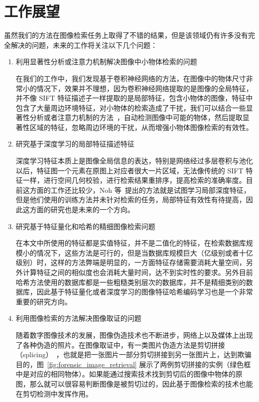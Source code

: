 \section{工作展望}
虽然我们的方法在图像检索任务上取得了不错的结果，但是该领域仍有许多没有完全解决的问题，未来的工作将关注以下几个问题：

\begin{enumerate}
\item 利用显著性分析或注意力机制解决图像中小物体检索的问题

在我们的工作中，我们发现基于卷积神经网络的方法，在图像中的物体尺寸非常小的情况下，效果并不理想，因为卷积神经网络提取的是图像的全局特征，并不像 SIFT 特征描述子一样提取的是局部特征，包含小物体的图像，特征中包含了大量周边环境特征，对小物体的检索造成了干扰，我们可以结合一些显著性分析或者注意力机制的方法~\cite{Song2017DeepSA}，自动检测图像中可能的物体，然后提取显著性区域的特征，忽略周边环境的干扰，从而增强小物体图像检索的有效性。

\item 研究基于深度学习的局部特征描述特征

深度学习特征本质上是图像全局信息的表达，特别是网络经过多层卷积与池化以后，特征图一个元素在原图上对应者很大一片区域，无法像传统的 SIFT 特征一样，进行空间几何校验，进行检索结果重排序，提高检索的准确率度。目前这方面的工作还比较少，Noh 等~\cite{Noh2017LargeScaleIR}提出的方法就是试图学习局部深度特征，但是他们使用的训练方法并未针对检索的任务，局部特征有效性有待提高，因此这方面的研究也是未来的一个方向。

\item 研究基于特征量化和哈希的精细图像检索问题

在本文中所使用的特征都是实值特征，并不是二值化的特征，在检索数据库规模小的情况下，这些方法是可行的，但是当数据库规模巨大（亿级别或者十亿级别）时，这样的方法弊端是明显的，一方面特征存储需要消耗大量空间，另外计算特征之间的相似度也会消耗大量时间，达不到实时性的要求。另外目前哈希方法使用的数据库都是一些粗糙类别层次的数据库，并不是精细类别的数据库，因此基于特征量化或者深度学习的图像特征哈希编码学习也是一个非常重要的研究方向。

\item 利用图像检索的方法解决图像取证的问题

随着数字图像技术的发展，图像伪造技术也不断进步，网络上以及媒体上出现了各种伪造的照片。在图像取证中，有一类图片伪造方法是剪切拼接（splicing）~\cite{Farid2009ImageFD}，也就是把一张图片一部分剪切拼接到另一张图片上，达到欺骗目的，图~\ref{fig:forensic_image_retrieval} 展示了两例剪切拼接的实例（绿色框中是对应的相同物体）。如果能通过搜索技术找到剪切后的图像中物体的原图，那么就可以很容易判断图像是被剪切过的，因此基于图像检索的技术也能在剪切检测中发挥作用。
\end{enumerate}







